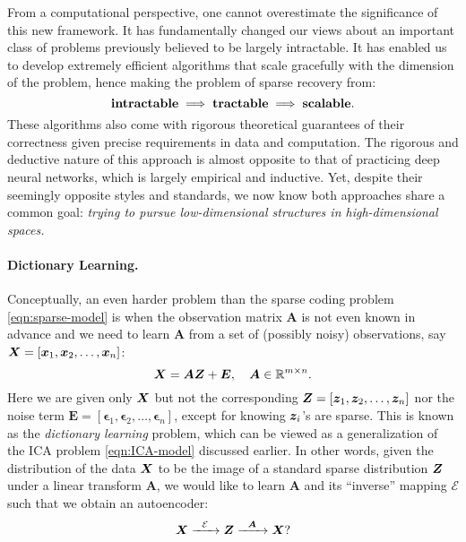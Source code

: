 \documentclass[../../book-main.tex]{subfiles}
\begin{document}
From a computational perspective, one cannot overestimate the significance of this new framework. It has fundamentally changed our views about an important class of problems previously believed to be largely intractable. It has enabled us to develop extremely efficient algorithms that scale gracefully with the dimension of the problem, hence making the problem of sparse recovery from:
\begin{equation}
    \mbox{\textbf{intractable}} \;
   \Longrightarrow \; \mbox{\textbf{tractable}} \; \Longrightarrow \; 
   \mbox{\textbf{scalable}}.
\end{equation}
These algorithms also come with rigorous theoretical guarantees of their correctness given precise requirements in data and computation. The rigorous and deductive nature of this approach is almost opposite to that of practicing deep neural networks, which is largely empirical and inductive. Yet, despite their seemingly opposite styles and standards, we now know both approaches share a common goal: {\em trying to pursue low-dimensional structures in high-dimensional spaces.}

\paragraph{Dictionary Learning.}
Conceptually, an even harder problem than the sparse coding problem \eqref{eqn:sparse-model} is when the observation matrix $\boldsymbol{A}$ is not even known in advance and we need to learn $\boldsymbol{A}$ from a set of (possibly noisy) observations, say $\bm{X} = [\bm{x}_1, \bm{x}_2, \ldots, \bm{x}_n]$:
\begin{equation}
    \bm{X} = \boldsymbol{A} \bm{Z} + \boldsymbol{E}, \quad \boldsymbol{A} \in \mathbb{R}^{m\times n}.
    \label{eqn:dictionary-learning}
\end{equation}
Here we are given only $\bm{X}$ but not the corresponding $\bm{Z} = [\bm{z}_1, \bm{z}_2, \ldots, \bm{z}_n]$ nor the noise term $\boldsymbol{E}= [\boldsymbol{\epsilon}_1, \boldsymbol{\epsilon}_2, \ldots, \boldsymbol{\epsilon}_n]$, except for knowing $\bm{z}_i$'s are sparse. This is known as the {\em dictionary learning} problem, which can be viewed as a generalization of the ICA problem \eqref{eqn:ICA-model} discussed earlier. In other words, given the distribution of the data $\bm{X}$ to be the image of a standard sparse distribution $\bm{Z}$ under a linear transform $\boldsymbol{A}$, we would like to learn $\boldsymbol{A}$ and its ``inverse'' mapping $\mathcal{E}$ such that we obtain an autoencoder:
\begin{equation}
    \bm{X}   \xrightarrow{\hspace{2mm} \mathcal{E} \hspace{2mm}}  \bm{Z} \xrightarrow{\hspace{2mm} \boldsymbol{A} \hspace{2mm}} \bm{X}?
       \label{eqn:decoding-DL}
\end{equation}
\end{document}
